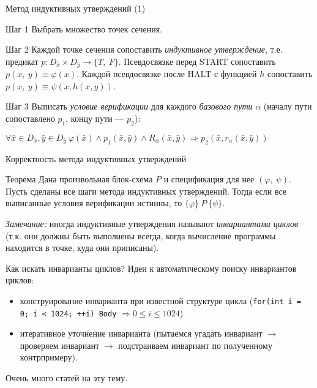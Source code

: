 \documentclass[hyperref={unicode=true}]{beamer}
\begin{document}
	\begin{frame}{Метод индуктивных утверждений (1)}
	\begin{block}{Шаг 1}
	Выбрать множество точек сечения.
	\end{block}
	\begin{block}{Шаг 2}
	Каждой точке сечения сопоставить \emph{индуктивное утверждение}, т.е. предикат $p : D_{\bar{x}} \times D_{\bar{y}} \rightarrow \{T,~F\}$. Псевдосвязке перед START сопоставить $p(x,~y)\equiv\varphi(x)$. Каждой псевдосвязке после HALT с функцией $h$ сопоставить $p(x,~y)\equiv\psi(x,h(x,y))$.
	\end{block}
	\begin{block}{Шаг 3}
	Выписать \emph{условие верификации} для каждого \emph{базового пути} $\alpha$
    (началу пути сопоставлено $p_1$, концу пути --- $p_2$):
    
    $\forall \bar{x} \in D_{\bar{x}},\bar{y} \in D_{\bar{y}}~\varphi(\bar{x})\land p_1(\bar{x},\bar{y})\land R_{\alpha}(\bar{x},\bar{y}) \Rightarrow p_2(\bar{x},r_{\alpha}(\bar{x},\bar{y}))$
    \end{block}
	\end{frame}

	\begin{frame}{Корректность метода индуктивных утверждений}
	\begin{block}{Теорема}
		Дана произвольная блок-схема $P$ и спецификация для нее $(\varphi,~\psi)$. Пусть сделаны все шаги метода индуктивных утверждений. Тогда если все выписанные условия верификации истинны, то $\{\varphi\}~P~\{\psi\}$.
	\end{block}

	\emph{Замечание:} иногда индуктивные утверждения называют \emph{инвариантами циклов} (т.к. они должны быть выполнены всегда, когда вычисление программы находится в точке, куда они приписаны).
	\end{frame}

    \begin{frame}{Как искать инварианты циклов?}
    Идеи к автоматическому поиску инвариантов циклов:
    \begin{itemize}
    \item конструирование инварианта при известной структуре цикла (\texttt{for(int i = 0; i < 1024; ++i) Body} $\Rightarrow 0 \leq i \leq 1024$)
    \item итеративное уточнение инварианта (пытаемся угадать инвариант $\rightarrow$ проверяем инвариант $\rightarrow$ подстраиваем инвариант по полученному контрпримеру).
    \end{itemize}

    Очень много статей на эту тему.    
    \end{frame}
\end{document}
